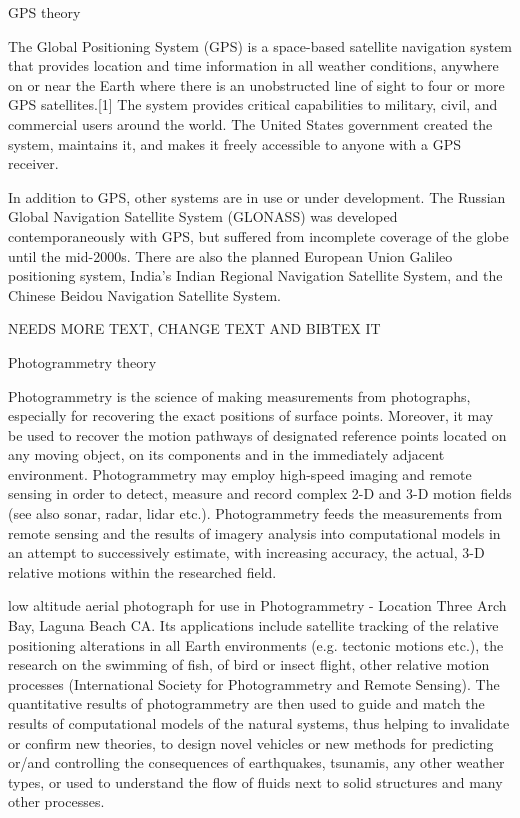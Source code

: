 GPS theory

The Global Positioning System (GPS) is a space-based satellite navigation system that provides location and time information in all weather conditions, anywhere on or near the Earth where there is an unobstructed line of sight to four or more GPS satellites.[1] The system provides critical capabilities to military, civil, and commercial users around the world. The United States government created the system, maintains it, and makes it freely accessible to anyone with a GPS receiver.

In addition to GPS, other systems are in use or under development. The Russian Global Navigation Satellite System (GLONASS) was developed contemporaneously with GPS, but suffered from incomplete coverage of the globe until the mid-2000s. There are also the planned European Union Galileo positioning system, India's Indian Regional Navigation Satellite System, and the Chinese Beidou Navigation Satellite System.

NEEDS MORE TEXT, CHANGE TEXT AND BIBTEX IT

Photogrammetry theory

Photogrammetry is the science of making measurements from photographs, especially for recovering the exact positions of surface points. Moreover, it may be used to recover the motion pathways of designated reference points located on any moving object, on its components and in the immediately adjacent environment. Photogrammetry may employ high-speed imaging and remote sensing in order to detect, measure and record complex 2-D and 3-D motion fields (see also sonar, radar, lidar etc.). Photogrammetry feeds the measurements from remote sensing and the results of imagery analysis into computational models in an attempt to successively estimate, with increasing accuracy, the actual, 3-D relative motions within the researched field.


low altitude aerial photograph for use in Photogrammetry - Location Three Arch Bay, Laguna Beach CA.
Its applications include satellite tracking of the relative positioning alterations in all Earth environments (e.g. tectonic motions etc.), the research on the swimming of fish, of bird or insect flight, other relative motion processes (International Society for Photogrammetry and Remote Sensing). The quantitative results of photogrammetry are then used to guide and match the results of computational models of the natural systems, thus helping to invalidate or confirm new theories, to design novel vehicles or new methods for predicting or/and controlling the consequences of earthquakes, tsunamis, any other weather types, or used to understand the flow of fluids next to solid structures and many other processes.

